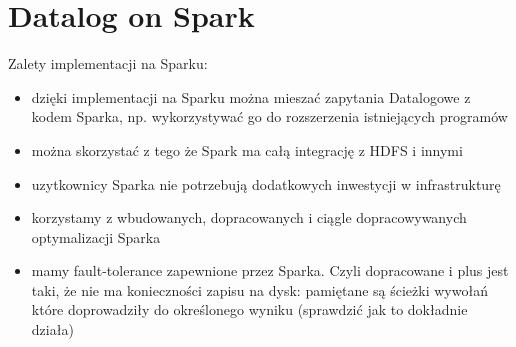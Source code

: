 

\chapter{Datalog on Spark}\label{r:implementation}



Zalety implementacji na Sparku:
\begin{itemize}
\item dzięki implementacji na Sparku można mieszać zapytania Datalogowe z kodem Sparka, np. wykorzystywać go do rozszerzenia istniejących programów
\item można skorzystać z tego że Spark ma całą integrację z HDFS i innymi
\item uzytkownicy Sparka nie potrzebują dodatkowych inwestycji w  infrastrukturę
\item korzystamy z wbudowanych, dopracowanych i ciągle dopracowywanych optymalizacji Sparka
\item mamy fault-tolerance zapewnione przez Sparka. Czyli dopracowane i plus jest taki, że nie ma konieczności zapisu na dysk: pamiętane są ścieżki wywołań które doprowadziły do określonego wyniku (sprawdzić jak to dokładnie działa)
\end{itemize}




